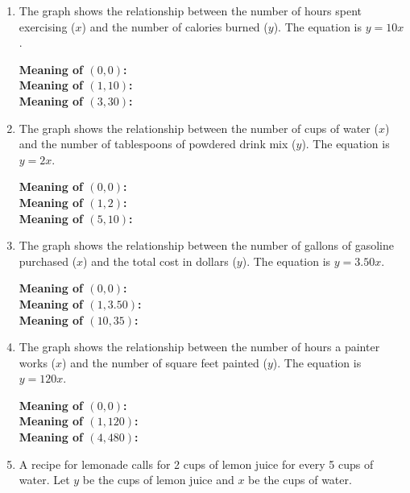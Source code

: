 \documentclass[12pt, letterpaper, fleqn]{article}
\newcommand{\blanklong}{\underline{\hspace{6.5cm}}}
\begin{document}
\begin{enumerate}[itemsep=2.5cm, leftmargin=0.6cm, resume]
\item The graph shows the relationship between the number of hours spent exercising ($x$) and the number of calories burned ($y$). The equation is $y = 10x$.

\begin{tcolorbox}[colback=customteal!10, sharp corners]
\textbf{Meaning of $(0, 0)$:} \blanklong \\
\textbf{Meaning of $(1, 10)$:} \blanklong \\
\textbf{Meaning of $(3, 30)$:} \blanklong
\end{tcolorbox}

\vspace{1.5cm}
\item The graph shows the relationship between the number of cups of water ($x$) and the number of tablespoons of powdered drink mix ($y$). The equation is $y = 2x$.

\vspace{1.5cm}

\begin{tcolorbox}[colback=customteal!10, sharp corners]
\textbf{Meaning of $(0, 0)$:} \blanklong \\
\textbf{Meaning of $(1, 2)$:} \blanklong \\
\textbf{Meaning of $(5, 10)$:} \blanklong
\end{tcolorbox}

\vspace{1.5cm}
\item The graph shows the relationship between the number of gallons of gasoline purchased ($x$) and the total cost in dollars ($y$). The equation is $y = 3.50x$.

\vspace{1.5cm}

\begin{tcolorbox}[colback=customteal!10, sharp corners]
\textbf{Meaning of $(0, 0)$:} \blanklong \\
\textbf{Meaning of $(1, 3.50)$:} \blanklong \\
\textbf{Meaning of $(10, 35)$:} \blanklong
\end{tcolorbox}

\vspace{1.5cm}
\item The graph shows the relationship between the number of hours a painter works ($x$) and the number of square feet painted ($y$). The equation is $y = 120x$.

\vspace{1.5cm}

\begin{tcolorbox}[colback=customteal!10, sharp corners]
\textbf{Meaning of $(0, 0)$:} \blanklong \\
\textbf{Meaning of $(1, 120)$:} \blanklong \\
\textbf{Meaning of $(4, 480)$:} \blanklong
\end{tcolorbox}
\item A recipe for lemonade calls for 2 cups of lemon juice for every 5 cups of water. Let $y$ be the cups of lemon juice and $x$ be the cups of water.
\end{enumerate}
\end{document}
